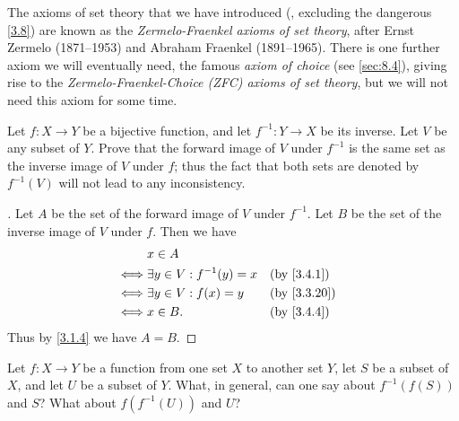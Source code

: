 \setcounter{thm}{11}
\begin{rmk}\label{3.4.12}
  The axioms of set theory that we have introduced (, excluding the dangerous \cref{3.8}) are known as the \emph{Zermelo-Fraenkel axioms of set theory}, after Ernst Zermelo (1871--1953) and Abraham Fraenkel (1891--1965).
  There is one further axiom we will eventually need, the famous \emph{axiom of choice} (see \cref{sec:8.4}), giving rise to the \emph{Zermelo-Fraenkel-Choice (ZFC) axioms of set theory}, but we will not need this axiom for some time.
\end{rmk}

\exercisesection

\begin{ex}\label{ex:3.4.1}
  Let \(f : X \to Y\) be a bijective function, and let \(f^{-1} : Y \to X\) be its inverse.
  Let \(V\) be any subset of \(Y\).
  Prove that the forward image of \(V\) under \(f^{-1}\) is the same set as the inverse image of \(V\) under \(f\);
  thus the fact that both sets are denoted by \(f^{-1}(V)\) will not lead to any inconsistency.
\end{ex}

\begin{proof}[]
  Let \(A\) be the set of the forward image of \(V\) under \(f^{-1}\).
  Let \(B\) be the set of the inverse image of \(V\) under \(f\).
  Then we have
  \begin{align*}
         & x \in A                                          \\
    \iff & \exists y \in V : f^{-1}(y) = x &  & \by{3.4.1}  \\
    \iff & \exists y \in V : f(x) = y      &  & \by{3.3.20} \\
    \iff & x \in B.                        &  & \by{3.4.4}
  \end{align*}
  Thus by \cref{3.1.4} we have \(A = B\).
\end{proof}

\begin{ex}\label{ex:3.4.2}
  Let \(f : X \to Y\) be a function from one set \(X\) to another set \(Y\), let \(S\) be a subset of \(X\), and let \(U\) be a subset of \(Y\).
  What, in general, can one say about \(f^{-1}(f(S))\) and \(S\)?
  What about \(f(f^{-1}(U))\) and \(U\)?
\end{ex}

